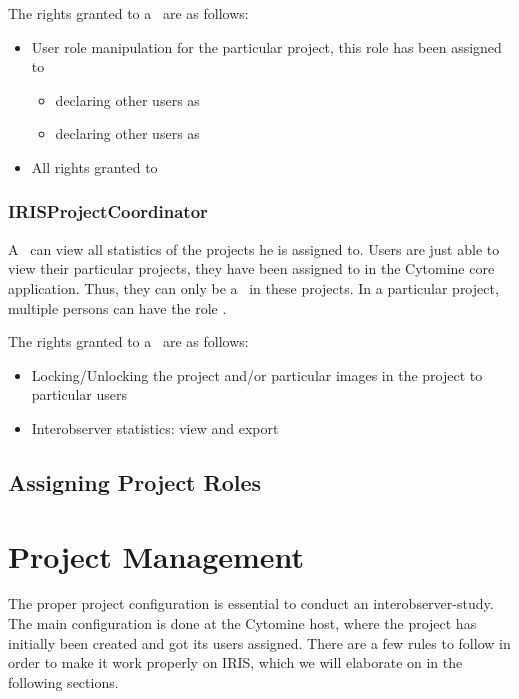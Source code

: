 The rights granted to a \pjadmin\ are as follows:
\begin{itemize}
\item User role manipulation for the particular project, this role has been assigned to
\begin{itemize}
\item declaring other users as \pjadmin
\item declaring other users as \pjcoord
\end{itemize}
\item All rights granted to \pjcoord
\end{itemize}



\subsection{IRISProjectCoordinator}
A \pjcoord\ can view all statistics of the projects he is assigned to. 
Users are just able to view their particular projects, they have been assigned to in the Cytomine core application.
Thus, they can only be a \pjcoord\ in these projects. 
In a particular project, multiple persons can have the role \pjcoord . 

The rights granted to a \pjcoord\ are as follows:
\begin{itemize}
\item Locking/Unlocking the project and/or particular images in the project to particular users
\item Interobserver statistics: view and export
\end{itemize}



\section{Assigning Project Roles}





%



\chapter{Project Management}
The proper project configuration is essential to conduct an interobserver-study. 
The main configuration is done at the Cytomine host, where the project has initially been created and got its users assigned. 
There are a few rules to follow in order to make it work properly on IRIS, which we will elaborate on in the following sections. 

